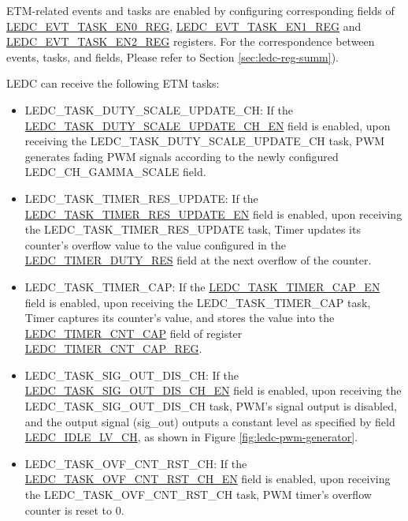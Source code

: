 \documentclass[main\_\_EN.tex]{subfiles}
\begin{document}
ETM-related events and tasks are enabled by configuring corresponding fields of  \hyperref[regdesc:LEDCEVTTASKEN0REG]{LEDC\_EVT\_TASK\_EN0\_REG}, \hyperref[regdesc:LEDCEVTTASKEN1REG]{LEDC\_EVT\_TASK\_EN1\_REG} and \hyperref[regdesc:LEDCEVTTASKEN2REG]{LEDC\_EVT\_TASK\_EN2\_REG} registers. For the correspondence between events, tasks, and fields, Please refer to Section \ref{sec:ledc-reg-summ}).

LEDC can receive the following ETM tasks:

\begin{itemize}
\item LEDC\_TASK\_DUTY\_SCALE\_UPDATE\_CH: If the \hyperref[fielddesc:LEDCTASKDUTYSCALEUPDATECHNEN]{LEDC\_TASK\_DUTY\_SCALE\_UPDATE\_CH\_EN} field is enabled, upon receiving the LEDC\_TASK\_DUTY\_SCALE\_UPDATE\_CH task, PWM generates fading PWM signals according to the newly configured LEDC\_CH\_GAMMA\_SCALE field.
\item LEDC\_TASK\_TIMER\_RES\_UPDATE: If the \hyperref[fielddesc:LEDCTASKTIMERNRESUPDATEEN]{LEDC\_TASK\_TIMER\_RES\_UPDATE\_EN} field is enabled, upon receiving the LEDC\_TASK\_TIMER\_RES\_UPDATE task, Timer updates its counter's overflow value to the value configured in the \hyperref[fielddesc:LEDCTIMERNDUTYRES]{LEDC\_TIMER\_DUTY\_RES} field at the next overflow of the counter.
\item LEDC\_TASK\_TIMER\_CAP: If the \hyperref[fielddesc:LEDCTASKTIMERNCAPEN]{LEDC\_TASK\_TIMER\_CAP\_EN} field is enabled, upon receiving the LEDC\_TASK\_TIMER\_CAP task, Timer captures its counter's value, and stores the value into the \hyperref[fielddesc:LEDCTIMERNCNTCAP]{LEDC\_TIMER\_CNT\_CAP} field of register \hyperref[regdesc:LEDCTIMERNCNTCAPREG]{LEDC\_TIMER\_CNT\_CAP\_REG}.
\item LEDC\_TASK\_SIG\_OUT\_DIS\_CH: If the \hyperref[fielddesc:LEDCTASKSIGOUTDISCHNEN]{LEDC\_TASK\_SIG\_OUT\_DIS\_CH\_EN} field is enabled, upon receiving the LEDC\_TASK\_SIG\_OUT\_DIS\_CH task, PWM's signal output is disabled, and the output signal (sig\_out) outputs a constant level as specified by field \hyperref[fielddesc:LEDCIDLELVCHN]{LEDC\_IDLE\_LV\_CH}, as shown in Figure \ref{fig:ledc-pwm-generator}.
\item LEDC\_TASK\_OVF\_CNT\_RST\_CH: If the \hyperref[fielddesc:LEDCTASKOVFCNTRSTCHNEN]{LEDC\_TASK\_OVF\_CNT\_RST\_CH\_EN} field is enabled, upon receiving the LEDC\_TASK\_OVF\_CNT\_RST\_CH task, PWM timer's overflow counter is reset to 0.

\end{itemize}
\end{document}
